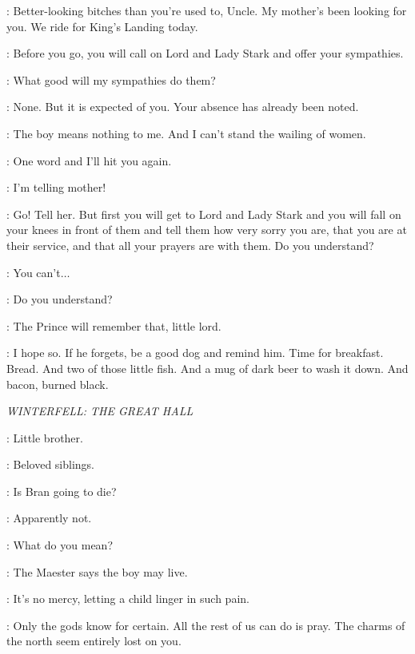 \JOFFREY: Better-looking bitches than you're used to, Uncle. My mother's been looking for you. We ride for King's Landing today. 

\TYRION: Before you go, you will call on Lord and Lady Stark and offer your sympathies. 

\JOFFREY: What good will my sympathies do them? 

\TYRION: None. But it is expected of you. Your absence has already been noted. 

\JOFFREY: The boy means nothing to me. And I can't stand the wailing of women. 


\TYRION: One word and I'll hit you again. 

\JOFFREY: I'm telling mother! 


\TYRION: Go! Tell her. But first you will get to Lord and Lady Stark and you will fall on your knees in front of them and tell them how very sorry you are, that you are at their service, and that all your prayers are with them. Do you understand? 

\JOFFREY: You can't$\ldots$ 

\TYRION: Do you understand? 


\HOUND: The Prince will remember that, little lord. 

\TYRION: I hope so. If he forgets, be a good dog and remind him. Time for breakfast. Bread. And two of those little fish. And a mug of dark beer to wash it down. And bacon, burned black. 

\scene

\textit{WINTERFELL: THE GREAT HALL}


\JAIME: Little brother. 

\TYRION: Beloved siblings. 

\MYRCELLA: Is Bran going to die? 

\TYRION: Apparently not. 

\CERSEI: What do you mean? 

\TYRION: The Maester says the boy may live. 

\CERSEI: It's no mercy, letting a child linger in such pain. 

\TYRION: Only the gods know for certain. All the rest of us can do is pray. The charms of the north seem entirely lost on you. 

